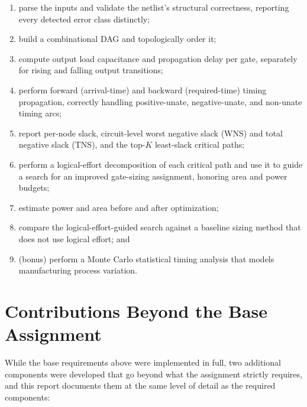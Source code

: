 \begin{enumerate}
    \item parse the inputs and validate the netlist's structural
          correctness, reporting every detected error class distinctly;
    \item build a combinational DAG and topologically order it;
    \item compute output load capacitance and propagation delay per gate,
          separately for rising and falling output transitions;
    \item perform forward (arrival-time) and backward (required-time)
          timing propagation, correctly handling positive-unate,
          negative-unate, and non-unate timing arcs;
    \item report per-node slack, circuit-level worst negative slack (WNS)
          and total negative slack (TNS), and the top-$K$ least-slack
          critical paths;
    \item perform a logical-effort decomposition of each critical path and
          use it to guide a search for an improved gate-sizing assignment,
          honoring area and power budgets;
    \item estimate power and area before and after optimization;
    \item compare the logical-effort-guided search against a baseline
          sizing method that does not use logical effort; and
    \item (bonus) perform a Monte Carlo statistical timing analysis that
          models manufacturing process variation.
\end{enumerate}

\section{Contributions Beyond the Base Assignment}
\label{sec:intro-contributions}

While the base requirements above were implemented in full, two additional
components were developed that go beyond what the assignment strictly
requires, and this report documents them at the same level of detail as the
required components:

